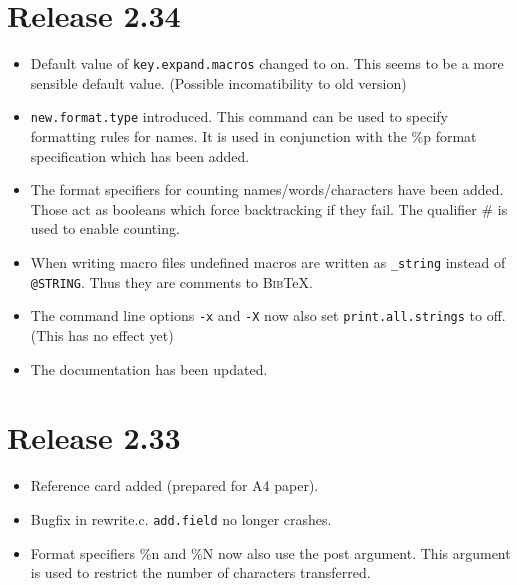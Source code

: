 \documentclass[11pt,a4paper]{scrartcl}
\newcommand\Arg[1]{\texttt{#1}}
\newcommand\rsc[1]{\texttt{#1}}
\newcommand\File[1]{\textsf{#1}}
\newcommand\BibTeX{\textsc{Bib}\TeX}
\newenvironment{Release}[2]{%
  \def\tmp{#2}%
  \section*{Release #1 \ifx\tmp\empty\else{\normalsize[#2]}\fi}
  \begin{itemize}
}{\end{itemize}}
\newenvironment{Fix}[1]{\item }{}
\newenvironment{New}[1]{\item }{}
\newenvironment{Doc}[1]{\item }{}
\newenvironment{Update}[1]{\item }{}
\begin{document}
\begin{multicols}
 \begin{Release}{2.34}{}
  \begin{Update}{gene}
    Default value of \rsc{key.expand.macros} changed to on. This seems
    to be a more sensible default value. (Possible incomatibility to old
    version)
  \end{Update}
  \begin{New}{gene}
    \rsc{new.format.type} introduced. This command can be used to
    specify formatting rules for names. It is used in conjunction with the \%p
    format specification which has been added.
  \end{New}
  \begin{New}{gene}
    The format specifiers for counting names/words/characters have been added.
    Those act as booleans which force backtracking if they fail. The qualifier
    \# is used to enable counting.
  \end{New}
  \begin{Update}{gene}
    When writing macro files undefined macros are written as
    \verb|_string| instead of \verb|@STRING|. Thus they are
    comments to \BibTeX{}.
  \end{Update}
  \begin{Update}{gene}
    The command line options \Arg{-x} and \Arg{-X} now also set
    \rsc{print.all.strings} to off. (This has no effect yet)
  \end{Update}
  \begin{Doc}{gene}
    The documentation has been updated.
  \end{Doc}
 \end{Release}

 \begin{Release}{2.33}{}
  \begin{New}{gene}
    Reference card added (prepared for A4 paper).
  \end{New}
  \begin{Fix}{gene}
    Bugfix in \File{rewrite.c}. \rsc{add.field} no longer crashes.
  \end{Fix}
  \begin{Update}{gene}
    Format specifiers \%n and \%N now also use the post argument. This
    argument is used to restrict the number of characters transferred.
  \end{Update}
 \end{Release}


\end{multicols}
\end{document}
